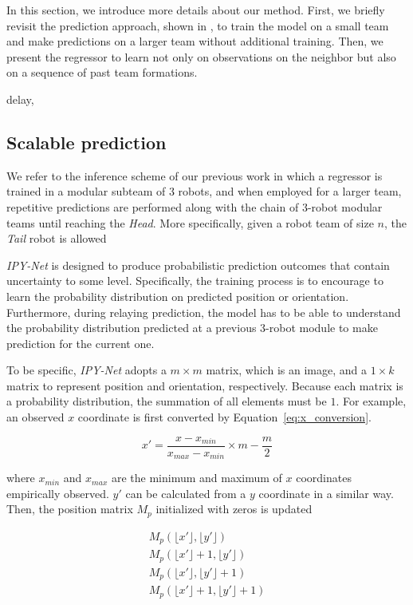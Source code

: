 \documentclass[letterpaper, 10 pt, conference]{ieeeconf}  %
\begin{document}
	In this section, we introduce more details about our method. First, 
	we briefly revisit the prediction approach, shown in \cite{CPR17}, 
	to train the model on a small team and make predictions on a larger team 
	without additional training. 
	Then, we present the regressor to learn not only on observations on 
	the neighbor but also on a sequence of past team formations.
	
	delay, 


	\subsection{Scalable prediction} 
	\label{sec:scalable_prediction}
	
	We refer to the inference scheme of our previous work \cite{CPR17} in which 
	a regressor is trained in a modular subteam of $3$ robots, and when employed 
	for a larger team, repetitive predictions are performed along with the chain 
	of $3$-robot modular teams until reaching the \emph{Head}. 
	More specifically, given a robot team of size $n$, the \emph{Tail} robot 
	is allowed 
	
	
	\emph{IPY-Net} is designed to produce probabilistic prediction outcomes that contain 
	uncertainty to some level. Specifically, the training process is to encourage to learn 
	the probability distribution on predicted position or orientation. 
	Furthermore, during relaying prediction, the model has to be able to understand 
	the probability distribution predicted at a previous $3$-robot module to 
	make prediction for the current one.  
	
	To be specific, \emph{IPY-Net} adopts a $m \times m$ matrix, which is an image, and 
	a $1 \times k$ matrix to represent position and orientation, respectively. Because  
	each matrix is a probability distribution, the summation of all elements must be $1$. 
	For example, an observed $x$ coordinate is first converted by Equation~\ref{eq:x_conversion}.
	
	\begin{equation}
	\label{eq:x_conversion}
		x' = \frac{x - x_{min}}{x_{max} - x_{min}} \times m - \frac{m}{2}
	\end{equation}
	
	where $x_{min}$ and $x_{max}$ are the minimum and maximum of $x$ coordinates
	empirically observed. $y'$ can be calculated from a $y$ coordinate in a similar way. 
	Then, the position matrix $M_p$ initialized with zeros is updated 
	
	\begin{equation}
		\begin{aligned}
		M_{p}(\lfloor{x'}\rfloor, \lfloor{y'}\rfloor) \\
		M_{p}(\lfloor{x'}\rfloor+1, \lfloor{y'}\rfloor) \\
		M_{p}(\lfloor{x'}\rfloor, \lfloor{y'}\rfloor+1) \\
		M_{p}(\lfloor{x'}\rfloor+1, \lfloor{y'}\rfloor+1) 
		\end{aligned}
	\end{equation} 
	
\end{document}
